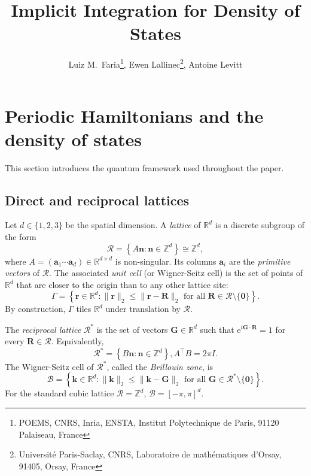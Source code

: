 \documentclass[11pt]{article}
\title{Implicit Integration for Density of States}
\date{}
\author{Luiz M.~Faria\thanks{POEMS, CNRS, Inria, ENSTA, Institut Polytechnique de Paris,
91120 Palaiseau, France}, Ewen Lallinec\thanks{Université Paris-Saclay, CNRS, Laboratoire
de mathématiques d'Orsay, 91405, Orsay, France}, Antoine Levitt\footnotemark[2]}
\numberwithin{equation}{section}
\begin{document}
\maketitle

\section{Periodic Hamiltonians and the density of states}\label{sec:framework}

This section introduces the quantum framework used throughout the paper.

\subsection{Direct and reciprocal lattices}\label{sec:lattices}

Let \(d \in \{1,2,3\}\) be the spatial dimension. A \emph{lattice} of \(\mathbb{R}^d\) is
a discrete subgroup of the form
\begin{equation}
    \mathcal{R} = \left\{ A\mathbf{n} : \mathbf{n} \in \mathbb{Z}^d \right\}
    \cong \mathbb{Z}^d,
\end{equation}
where \(A = (\mathbf{a}_1\cdots\mathbf{a}_d) \in \mathbb{R}^{d\times d}\) is non-singular.
Its columns \(\mathbf{a}_i\) are the \emph{primitive vectors} of \(\mathcal{R}\). The
associated \emph{unit cell} (or Wigner-Seitz cell) is the set of points of
\(\mathbb{R}^d\) that are closer to the origin than to any other lattice site:
\begin{equation}
    \Gamma = \left\{ \mathbf{r} \in \mathbb{R}^d :
    \|\mathbf{r}\|_2 \leq \|\mathbf{r}-\mathbf{R}\|_2
    \text{ for all } \mathbf{R} \in \mathcal{R}\setminus\{\mathbf{0}\}
    \right\}.
\end{equation}
By construction, \(\Gamma\) tiles \(\mathbb{R}^d\) under translation by \(\mathcal{R}\).

The \emph{reciprocal lattice} \(\mathcal{R}^*\) is the set of vectors \(\mathbf{G} \in
\mathbb{R}^d\) such that \(\mathrm{e}^{i\mathbf{G}\cdot\mathbf{R}} = 1\) for every
\(\mathbf{R} \in \mathcal{R}\). Equivalently,
\begin{equation}
    \mathcal{R}^* = \left\{ B\mathbf{n} : \mathbf{n} \in \mathbb{Z}^d \right\},
    A^\intercal B = 2\pi I.
\end{equation}
The Wigner-Seitz cell of \(\mathcal{R}^*\), called the \emph{Brillouin zone}, is
\begin{equation}
    \mathcal{B} = \left\{ \mathbf{k} \in \mathbb{R}^d :
    \|\mathbf{k}\|_2 \leq \|\mathbf{k}-\mathbf{G}\|_2
    \text{ for all } \mathbf{G} \in \mathcal{R}^*\setminus\{\mathbf{0}\}
    \right\}.
\end{equation}
For the standard cubic lattice \(\mathcal{R} = \mathbb{Z}^d\), \(\mathcal{B} = [-\pi,
    \pi]^d\).
\end{document}
